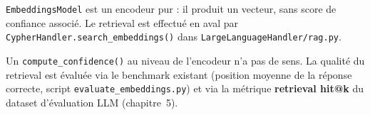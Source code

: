 \texttt{EmbeddingsModel} est un encodeur pur : il produit un vecteur,
sans score de confiance associé. Le retrieval est effectué en aval par
\texttt{CypherHandler.search\_embeddings()} dans \texttt{LargeLanguageHandler/rag.py}.

Un \texttt{compute\_confidence()} au niveau de l'encodeur n'a pas de sens.
La qualité du retrieval est évaluée via le benchmark existant (position moyenne
de la réponse correcte, script \texttt{evaluate\_embeddings.py}) et via la
métrique \textbf{retrieval hit@k} du dataset d'évaluation LLM (chapitre~5).




